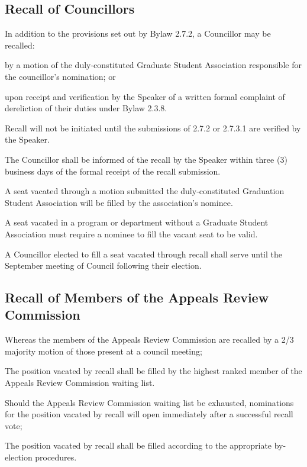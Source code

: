 \subsection {Recall of Councillors}
\begin{longenum}[ label*=\thesubsection.\arabic*., align=left]
	\item In addition to the provisions set out by Bylaw 2.7.2, a Councillor may be recalled:
    \begin{longenum}[ label*=\arabic*., align=left]
		\item by a motion of the duly-constituted Graduate Student Association responsible for the councillor's nomination; or
        \item upon receipt and verification by the Speaker of a written formal complaint of dereliction of their duties under Bylaw 2.3.8.
	\end{longenum}
    \item Recall will not be initiated until the submissions of 2.7.2 or 2.7.3.1 are verified by the Speaker.
    \item The Councillor shall be informed of the recall by the Speaker within three (3) business days of the formal receipt of the recall submission.
    \item A seat vacated through a motion submitted the duly-constituted Graduation Student Association will be filled by the association's nominee.
    \item A seat vacated in a program or department without a Graduate Student Association must require a nominee to fill the vacant seat to be valid. 
    \item A Councillor elected to fill a seat vacated through recall shall serve until the September meeting of Council following their election.
\end{longenum}

\subsection{Recall of Members of the Appeals Review Commission}
\begin{longenum}[ label*=\thesubsection.\arabic*., align=left]
	\item Whereas the members of the Appeals Review Commission are recalled by a 2/3 majority motion of those present at a council meeting;
	\begin{longenum}[ label*=\arabic*., align=left]
		\item The position vacated by recall shall be filled by the highest ranked member of the Appeals Review Commission waiting list.
    	\item Should the Appeals Review Commission waiting list be exhausted, nominations for the position vacated by recall will open immediately after a successful recall vote;
    	\item The position vacated by recall shall be filled according to the appropriate by-election procedures.
    \end{longenum}
\end{longenum}

